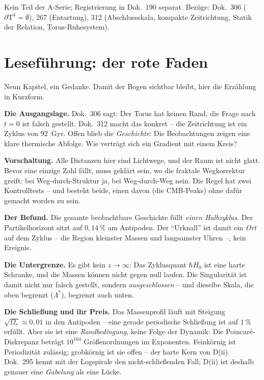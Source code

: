 Kein Teil der A-Serie; Registrierung in Dok.~190 separat. Bezüge:
Dok.~306 ($\partial\text{T}^4 = \emptyset$), 267 (Entartung),
312 (Abschlussskala, kompakte Zeitrichtung, Statik der Relation,
Torus-Ruhesystem).

\section*{Leseführung: der rote Faden}

Neun Kapitel, ein Gedanke. Damit der Bogen sichtbar bleibt, hier
die Erzählung in Kurzform.

\textbf{Die Ausgangslage.} Dok.~306 sagt: Der Torus hat keinen
Rand, die Frage nach $t=0$ ist falsch gestellt. Dok.~312 macht das
konkret -- die Zeitrichtung ist ein Zyklus von $92$~Gyr. Offen
blieb die \emph{Geschichte}: Die Beobachtungen zeigen eine klare
thermische Abfolge. Wie verträgt sich ein Gradient mit einem
Kreis?

\textbf{Vorschaltung.} Alle Distanzen hier sind Lichtwege, und der
Raum ist nicht glatt. Bevor eine einzige Zahl fällt, muss geklärt
sein, wo die fraktale Wegkorrektur greift: bei Weg-durch-Struktur
ja, bei Weg-durch-Weg nein. Die Regel hat zwei Kontrolltests --
und besteht beide, einen davon (die CMB-Peaks) ohne dafür gemacht
worden zu sein.

\textbf{Der Befund.} Die gesamte beobachtbare Geschichte füllt
\emph{einen Halbzyklus}. Der Partikelhorizont sitzt auf
$0{,}14\,\%$ am Antipoden. Der \enquote{Urknall} ist damit ein
\emph{Ort} auf dem Zyklus -- die Region kleinster Massen und
langsamster Uhren --, kein Ereignis.

\textbf{Die Untergrenze.} Es gibt kein $z \to \infty$: Das
Zyklusquant $\hbar H_0$ ist eine harte Schranke, und die Massen
können nicht gegen null laufen. Die Singularität ist damit nicht
nur falsch gestellt, sondern \emph{ausgeschlossen} -- und
dieselbe Skala, die oben begrenzt ($\Lambda^{*}$), begrenzt auch
unten.

\textbf{Die Schließung und ihr Preis.} Das Massenprofil läuft mit
Steigung $\sqrt{\Omega_r} \approx 0{,}01$ in den Antipoden -- eine
gerade periodische Schließung ist auf $1\,\%$ erfüllt. Aber sie
ist eine \emph{Randbedingung}, keine Folge der Dynamik: Die
Poincaré-Diskrepanz beträgt $10^{104}$ Größenordnungen im
Exponenten. Feinkörnig ist Periodizität zulässig; grobkörnig ist
sie offen -- der harte Kern von D(ii). Dok.~295 kennt mit der
Logspirale den nicht-schließenden Fall; D(ii) ist deshalb genauer
eine \emph{Gabelung} als eine Lücke.


